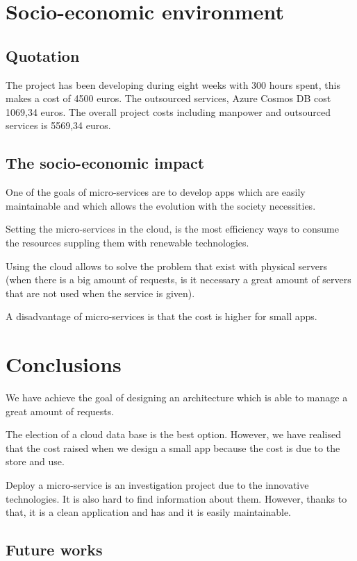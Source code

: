 \documentclass[12pt]{report} %
\begin{document}
\section{Socio-economic environment}	

\subsection{Quotation}

The project has been developing during eight weeks with 300 hours spent, this makes a cost of 4500 euros. The outsourced services, Azure Cosmos DB cost 1069,34 euros. The overall project costs including manpower and outsourced services is 5569,34 euros.

\subsection{The socio-economic impact}

One of the goals of micro-services are to develop apps which are easily maintainable and which allows the evolution with the society necessities.

Setting the micro-services in the cloud, is the most efficiency ways to consume the resources suppling them with renewable technologies.

Using the cloud allows to solve the problem that exist with physical servers (when there is a big amount of requests, is it necessary a great amount of servers that are not used when the service is given). 

A disadvantage of micro-services is that the cost is higher for small apps.

\section{Conclusions}

We have achieve the goal of designing an architecture which is able to manage a great amount of requests.

The election of a cloud data base is the best option. However, we have realised that the cost raised when we design a small app because the cost is due to the store and use.

Deploy a micro-service is an investigation project due to the innovative technologies. It is also hard to find information about them. However, thanks to that, it is a clean application and has and it is easily maintainable. 

\subsection{Future works}
\end{document}
